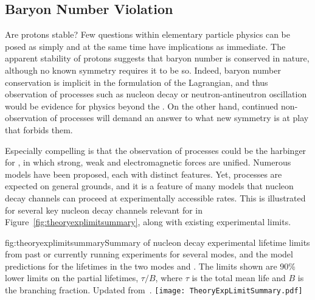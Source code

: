\subsection{Baryon Number Violation}

Are protons %
stable? Few questions within elementary 
particle physics can be posed as simply and at the same time 
have implications as immediate.  The 
apparent stability of protons suggests that baryon number 
is conserved in nature, although no known symmetry 
requires it to be so.  Indeed, baryon number conservation is 
implicit in the formulation of the  Lagrangian, and 
thus observation of  processes such 
as nucleon decay or neutron-antineutron oscillation 
would be evidence for physics beyond the .
On the other hand, continued non-observation of  processes will 
demand an answer to what new symmetry is at play that forbids 
them.
 
Especially compelling is that the observation of  processes 
could be the harbinger for , in which strong, weak and 
electromagnetic forces are unified.  Numerous  models 
have been proposed, each with distinct features.  Yet,  processes 
are expected on general grounds, and it is a feature of many models 
that nucleon decay channels can proceed at experimentally 
accessible rates.  This is illustrated for several key nucleon 
decay channels relevant for  in 
Figure~\ref{fig:theoryexplimitsummary}, along with existing 
experimental limits.

\begin{dunefigure}{fig:theoryexplimitsummary}{Summary of nucleon decay experimental lifetime limits from past or currently running experiments for several modes, and the model predictions for the lifetimes in the two modes \ptoepizero and \ptoknubar.  The limits shown are 90\%  lower limits on the partial lifetimes, $\tau/B$, where $\tau$ is the total mean life and $B$ is the branching fraction. Updated from~\cite{Babu:2013jba}.}
\texttt{[image: TheoryExpLimitSummary.pdf]}
\end{dunefigure}

